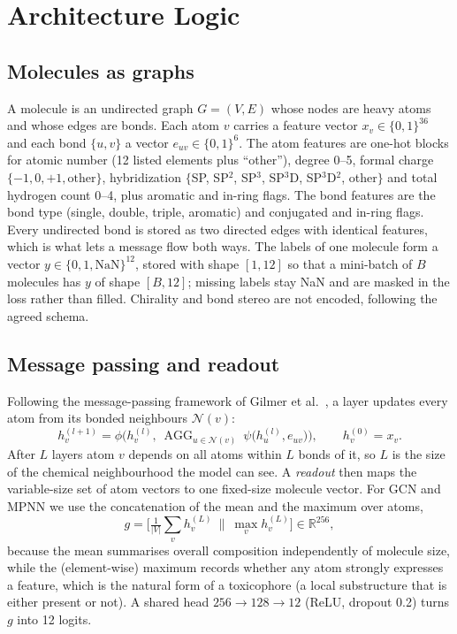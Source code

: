 \section{Architecture Logic}
\label{sec:gnn-arch}

\subsection{Molecules as graphs}
A molecule is an undirected graph $G=(V,E)$ whose nodes are heavy atoms and whose edges are bonds. Each atom $v$ carries a feature vector $x_v\in\{0,1\}^{36}$ and each bond $\{u,v\}$ a vector $e_{uv}\in\{0,1\}^{6}$. The atom features are one-hot blocks for atomic number (12 listed elements plus ``other''), degree 0--5, formal charge $\{-1,0,+1,\text{other}\}$, hybridization $\{$SP, SP$^2$, SP$^3$, SP$^3$D, SP$^3$D$^2$, other$\}$ and total hydrogen count 0--4, plus aromatic and in-ring flags. The bond features are the bond type (single, double, triple, aromatic) and conjugated and in-ring flags. Every undirected bond is stored as two directed edges with identical features, which is what lets a message flow both ways. The labels of one molecule form a vector $y\in\{0,1,\mathrm{NaN}\}^{12}$, stored with shape $[1,12]$ so that a mini-batch of $B$ molecules has $y$ of shape $[B,12]$; missing labels stay NaN and are masked in the loss rather than filled. Chirality and bond stereo are not encoded, following the agreed schema.

\subsection{Message passing and readout}
Following the message-passing framework of Gilmer et al.~\cite{gilmer2017mpnn}, a layer updates every atom from its bonded neighbours $\mathcal N(v)$:
\begin{equation}
h_v^{(l+1)}=\phi\Big(h_v^{(l)},\ \mathop{\mathrm{AGG}}_{u\in\mathcal N(v)}\ \psi\big(h_u^{(l)},e_{uv}\big)\Big),\qquad h_v^{(0)}=x_v .
\end{equation}
After $L$ layers atom $v$ depends on all atoms within $L$ bonds of it, so $L$ is the size of the chemical neighbourhood the model can see. A \emph{readout} then maps the variable-size set of atom vectors to one fixed-size molecule vector. For GCN and MPNN we use the concatenation of the mean and the maximum over atoms,
\begin{equation}
g=\Big[\tfrac1{|V|}\textstyle\sum_{v}h_v^{(L)}\ \Big\|\ \max_{v}h_v^{(L)}\Big]\in\mathbb R^{256},
\end{equation}
because the mean summarises overall composition independently of molecule size, while the (element-wise) maximum records whether any atom strongly expresses a feature, which is the natural form of a toxicophore (a local substructure that is either present or not). A shared head $256\to128\to12$ (ReLU, dropout 0.2) turns $g$ into 12 logits.

